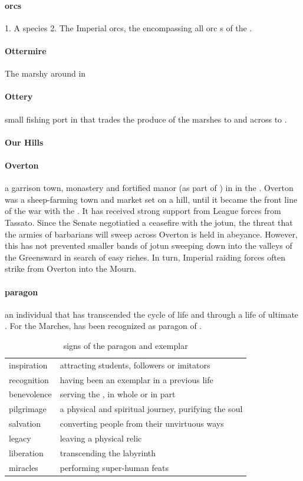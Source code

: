 \paragraph{orcs} 1. A species 2. The Imperial orcs, the  encompassing all orc s of the .
\paragraph{Ottermire} The marshy  around  in 
\paragraph{Ottery} small fishing port in  that trades the produce of the marshes to  and across  to .
\paragraph{Our Hills} 
\paragraph{Overton} a garrison town, monastery and fortified manor (as part of ) in  in the . Overton was a sheep-farming town and market set on a hill, until it became the front line of the war with the . It has received strong support from League forces from Tassato. Since the Senate negotiatied a ceasefire with the jotun, the threat that the armies of barbarians will sweep across Overton is held in abeyance. However, this has not prevented smaller bands of jotun sweeping down into the valleys of the Greensward in search of easy riches. In turn, Imperial raiding forces often strike from Overton into the Mourn.
\paragraph{paragon} an individual that has transcended the cycle of life and  through a life of ultimate . For the Marches,  has been recognized as paragon of . \begin{table} \centering \begin{tabular}{ll} inspiration & attracting students, followers or imitators \\ recognition & having been an exemplar in a previous life \\ benevolence & serving the \s{Empire}, in whole or in part \\ pilgrimage & a physical and spiritual journey, purifying the soul \\ salvation & converting people from their unvirtuous ways \\ legacy & leaving a physical relic \\\hline liberation & transcending the labyrinth \\ miracles & performing super-human feats \end{tabular}\caption{signs of the paragon and exemplar}\end{table}
